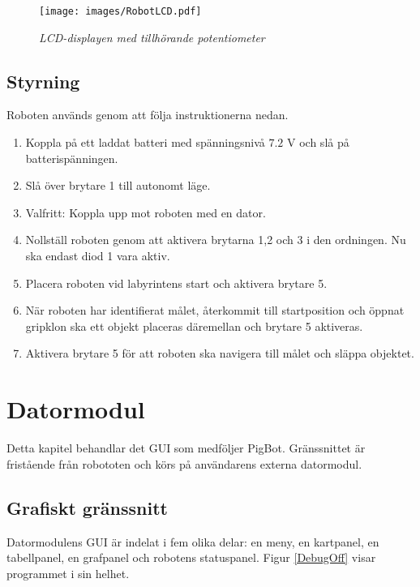 \documentclass[11pt]{article}
\begin{document}
\begin{figure}[htbp]
	\centering
	\texttt{[image: images/RobotLCD.pdf]}
	\caption{\textit{LCD-displayen med tillhörande potentiometer} \label{lcdPot}}
\end{figure}



\subsection{Styrning}
Roboten används genom att följa instruktionerna nedan.
\begin{enumerate}
    \renewcommand*\labelenumi{\theenumi\vspace{1pt} - }
  \item Koppla på ett laddat batteri med spänningsnivå $7.2$ V och slå på batterispänningen.
  \item Slå över brytare 1 till autonomt läge.
    \renewcommand*\labelenumi{(\theenumi)\vspace{1pt} - }

  \item Valfritt: Koppla upp mot roboten med en dator.
    \renewcommand*\labelenumi{\theenumi\vspace{1pt} - }
  \item Nollställ roboten genom att aktivera brytarna 1,2 och 3 i den ordningen. Nu ska endast diod 1 vara aktiv.
  \item Placera roboten vid labyrintens start och aktivera brytare 5. 
  \item När roboten har identifierat målet, återkommit till startposition och öppnat gripklon ska ett objekt placeras däremellan och brytare 5 aktiveras.
  \item Aktivera brytare 5 för att roboten ska navigera till målet och släppa objektet. 
\end{enumerate}


\section{Datormodul}
Detta kapitel behandlar det GUI som medföljer PigBot. Gränssnittet är fristående från robototen och körs på användarens externa datormodul.

\subsection{Grafiskt gränssnitt}
Datormodulens GUI är indelat i fem olika delar: en meny, en kartpanel, en tabellpanel, en grafpanel och robotens statuspanel. Figur \ref{DebugOff} visar programmet i sin helhet.
\end{document}
